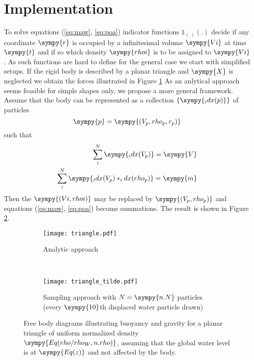 \documentclass[12pt,a4paper]{article}
\newcommand{\s}{\sympy}
\begin{document}
\section{Implementation}
To solve equations (\ref{eq:maw}, \ref{eq:poa}) indicator functions $\mathds{1}_{(.)}(.)$ decide if any coordinate $\s{r}$ is occupied by a infinitesimal volume $\s{Vi}$ at time $\s{t}$ and if so which density $\s{rhoi}$ is to be assigned to $\s{Vi}$.
As such functions are hard to define for the general case we start with simplified setups.  
If the rigid body is described by a planar triangle and $\s{X}$ is neglected we obtain the forces illustrated in Figure \ref{fg:fbda}
As an anlytical approach seems feasible for simple shapes only, we propose a more general framework.
Assume that the body can be represented as a collection $\{\s{_idx(p)}\}$ of particles
\begin{equation*}
	\s{p} = \s{(V_p, rho_p, r_p)}	
\end{equation*}
such that
\begin{equation*}
	\begin{split}
\sum\limits_i^N \s{_idx(V_p)} = \s{V} \\ 
\sum\limits_i^N \s{_idx(V_p) * _idx(rho_p)} = \s{m}
\end{split}
\end{equation*}
Then the $\s{(Vi, rhoi)}$ may be replaced by $\s{(V_p, rho_p)}$ and equations (\ref{eq:maw}, \ref{eq:poa}) become summations.
The result is shown in Figure \ref{fg:fbdb}.  
\begin{figure}
\centering
\begin{subfigure}[t]{0.4\textwidth}
\texttt{[image: triangle.pdf]}
\caption{Analytic approach}
\label{fg:fbda}
\end{subfigure}
~
\begin{subfigure}[t]{0.4\textwidth}
\texttt{[image: triangle\_tilde.pdf]}
\caption{Sampling approach with $N = \s{n.N}$ particles (every $\s{10}$th displaced water particle drawn)}
\label{fg:fbdb}
\end{subfigure}
\caption{Free body diagrams illustrating buoyancy and gravity for a planar triangle of uniform normalized density $\s{Eq(rho/rho_W, n.rho)}$, assuming that the global water level is at $\s{Eq(z)}$ and not affected by the body.}
\label{fg:fbd}
\end{figure}
\end{document}
